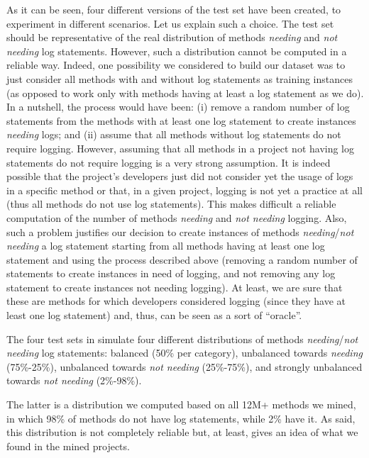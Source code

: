 As it can be seen, four different versions of the test set have been created, to experiment \approach in different scenarios. Let us explain such a choice. The test set should be representative of the real distribution of methods \emph{needing} and \emph{not needing} log statements. However, such a distribution cannot be computed in a reliable way. Indeed, one possibility we considered to build our dataset was to just consider all methods with and without log statements as training instances (as opposed to work only with methods having at least a log statement as we do). In a nutshell, the process would have been: (i) remove a random number of log statements from the methods with at least one log statement to create instances \emph{needing} logs; and (ii) assume that all methods without log statements do not require logging. However, assuming that all methods in a project not having log statements do not require logging is a very strong assumption. It is indeed possible that the project's developers just did not consider yet the usage of logs in a specific method or that, in a given project, logging is not yet a practice at all (thus all methods do not use log statements). This makes difficult a reliable computation of the number of methods \emph{needing} and \emph{not needing} logging. Also, such a problem justifies our decision to create instances of methods \emph{needing}/\emph{not needing} a log statement starting from all methods having at least one log statement and using the process described above (\ie removing a random number of statements to create instances in need of logging, and not removing any log statement to create instances not needing logging). At least, we are sure that these are methods for which developers considered logging (since they have at least one log statement) and, thus, can be seen as a sort of ``oracle''. 

The four test sets in  simulate four different distributions of methods \emph{needing}/\emph{not needing} log statements: balanced (50\% per category), unbalanced towards \emph{needing} (75\%-25\%), unbalanced towards \emph{not needing} (25\%-75\%), and strongly unbalanced towards \emph{not needing} (2\%-98\%). 

The latter is a distribution we computed based on all 12M+ methods we mined, in which 98\% of methods do not have log statements, while 2\% have it. As said, this distribution is not completely reliable but, at least, gives an idea of what we found in the mined projects.



